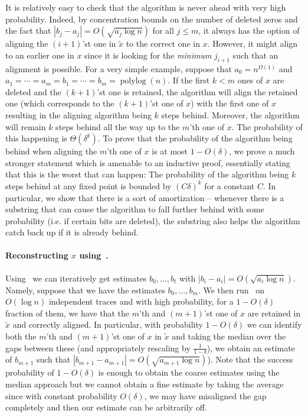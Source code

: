\documentclass[12pt]{article}
\theoremstyle{definition}
\theoremstyle{remark}
\DeclareMathOperator*{\polylog}{polylog}
\begin{document}
It is relatively easy to check that the algorithm is never ahead with very high probability. Indeed, by concentration bounds on the number of deleted zeros and the fact that $|b_j-a_j|=O(\sqrt{a_j\log n})$ for all $j\leq m$, it always has the option of aligning the $(i+1)$'st one in $\tilde x$ to the correct one in $x$. However, it might align to an earlier one in $x$ since it is looking for the \emph{minimum} $j_{i+1}$ such that an alignment is possible. For a very simple example, suppose that $a_0=n^{\Omega(1)}$ and $a_1=\cdots=a_m=b_1=\cdots=b_m=\polylog(n)$. If the first $k<m$ ones of $x$ are deleted and the $(k+1)$'st one is retained, the algorithm will align the retained one (which corresponds to the $(k+1)$'st one of $x$) with the first one of $x$ resulting in the aligning algorithm being $k$ steps behind. Moreover, the algorithm will remain $k$ steps behind all the way up to the $m$'th one of $x$. The probability of this happening is $\Theta(\delta^k)$. To prove that the probability of the algorithm being behind when aligning the $m$'th one of $x$ is at most $1-O(\delta)$, we prove a much stronger statement which is amenable to an inductive proof, essentially stating that this is the worst that can happen: The probability of the algorithm being $k$ steps behind at any fixed point is bounded by $(C\delta)^k$ for a constant $C$.
In particular, we show that there is a sort of amortization \--- whenever there is a substring that can cause the algorithm to fall further behind with some probability (i.e. if certain bits are deleted), the substring also helps the algorithm catch back up if it is already behind. 







\paragraph{Reconstructing $x$ using~.}
Using~ we can iteratively get estimates $b_0,\dots,b_t$ with $|b_i-a_i|=O(\sqrt{a_i\log n})$. Namely, suppose that we have the estimates $b_0,\dots,b_m$. We then run~ on $O(\log n)$ independent traces and with high probability, for a $1-O(\delta)$ fraction of them, we have that the $m$'th and $(m+1)$'st one of $x$ are retained in $\tilde x$ and correctly aligned. In particular, with probability $1-O(\delta)$ we can identify both the $m$'th and $(m+1)$'st one of $x$ in $\tilde x$ and taking the median over the gaps between these (and appropriately rescaling by $\frac{1}{1-\delta}$), we obtain an estimate of $b_{m+1}$ such that $|b_{m+1}-a_{m+1}|=O(\sqrt{a_{m+1}\log n})$). Note that the success probability of $1-O(\delta)$ is enough to obtain the coarse estimates using the median approach but we cannot obtain a fine estimate by taking the average since with constant probability $O(\delta)$, we may have misaligned the gap completely and then our estimate can be arbitrarily off. 
\end{document}
